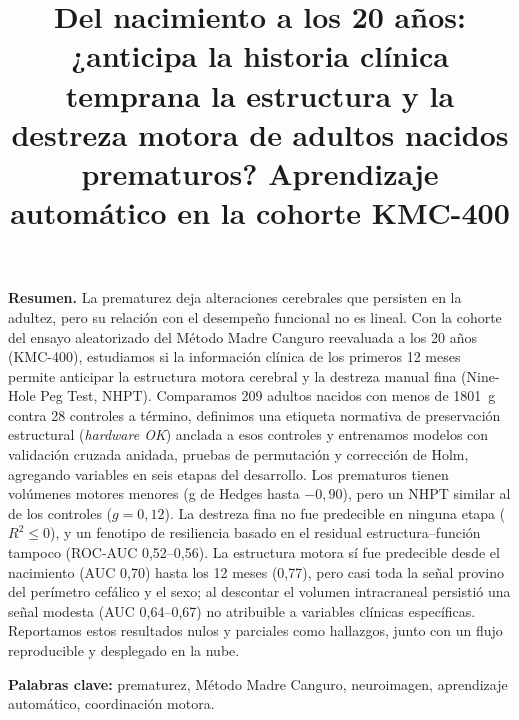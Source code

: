 \documentclass[conference,letterpaper,10pt]{IEEEtran}
\begin{document}
\title{Del nacimiento a los 20 años: ¿anticipa la historia clínica temprana la estructura y la destreza motora de adultos nacidos prematuros? Aprendizaje automático en la cohorte KMC-400}

\author{
}

\maketitle

\noindent\textbf{Resumen.} La prematurez deja alteraciones cerebrales que persisten en la adultez, pero su relación con el desempeño funcional no es lineal. Con la cohorte del ensayo aleatorizado del Método Madre Canguro reevaluada a los 20 años (KMC-400), estudiamos si la información clínica de los primeros 12 meses permite anticipar la estructura motora cerebral y la destreza manual fina (Nine-Hole Peg Test, NHPT). Comparamos 209 adultos nacidos con menos de 1801~g contra 28 controles a término, definimos una etiqueta normativa de preservación estructural (\emph{hardware OK}) anclada a esos controles y entrenamos modelos con validación cruzada anidada, pruebas de permutación y corrección de Holm, agregando variables en seis etapas del desarrollo. Los prematuros tienen volúmenes motores menores (g de Hedges hasta $-0{,}90$), pero un NHPT similar al de los controles ($g = 0{,}12$). La destreza fina no fue predecible en ninguna etapa ($R^2 \le 0$), y un fenotipo de resiliencia basado en el residual estructura--función tampoco (ROC-AUC 0,52--0,56). La estructura motora sí fue predecible desde el nacimiento (AUC 0,70) hasta los 12 meses (0,77), pero casi toda la señal provino del perímetro cefálico y el sexo; al descontar el volumen intracraneal persistió una señal modesta (AUC 0,64--0,67) no atribuible a variables clínicas específicas. Reportamos estos resultados nulos y parciales como hallazgos, junto con un flujo reproducible y desplegado en la nube.

\vspace{4pt}\noindent\textbf{Palabras clave:} prematurez, Método Madre Canguro, neuroimagen, aprendizaje automático, coordinación motora.
\end{document}

